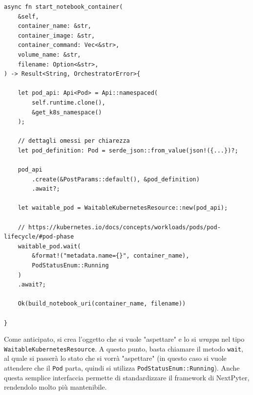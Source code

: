 \begin{verbatim}
async fn start_notebook_container(
    &self, 
    container_name: &str,
    container_image: &str,
    container_command: Vec<&str>,
    volume_name: &str,
    filename: Option<&str>,
) -> Result<String, OrchestratorError>{

    let pod_api: Api<Pod> = Api::namespaced(
        self.runtime.clone(), 
        &get_k8s_namespace()
    );

    // dettagli omessi per chiarezza
    let pod_definition: Pod = serde_json::from_value(json!({...})?;

    pod_api
        .create(&PostParams::default(), &pod_definition)
        .await?;

    let waitable_pod = WaitableKubernetesResource::new(pod_api);

    // https://kubernetes.io/docs/concepts/workloads/pods/pod-lifecycle/#pod-phase
    waitable_pod.wait(
        &format!("metadata.name={}", container_name), 
        PodStatusEnum::Running
    )
    .await?;
        
    Ok(build_notebook_uri(container_name, filename))

}
\end{verbatim}
Come anticipato, si crea l'oggetto che si vuole "aspettare" e lo si \textit{wrappa} nel tipo \verb|WaitableKubernetesResource|. A questo punto, basta chiamare il metodo \verb|wait|, al quale si passerà lo stato che si vorrà "aspettare" (in questo caso si vuole attendere che il \verb|Pod| parta, quindi si utilizza \verb|PodStatusEnum::Running|).
\newline
Anche questa semplice interfaccia permette di standardizzare il framework di NextPyter, rendendolo molto più mantenibile.
\newpage
